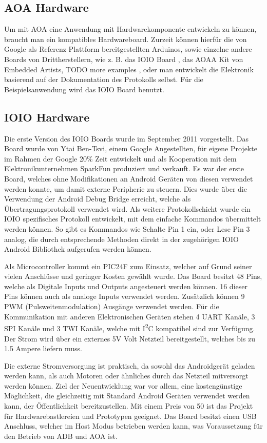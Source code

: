 \documentclass[12pt,journal,compsoc]{IEEEtran}
\begin{document}
\subsection{AOA Hardware}
Um mit AOA eine Anwendung mit Hardwarekomponente entwickeln zu können, braucht man ein kompatibles Hardwareboard.
Zurzeit können hierfür die von Google als Referenz Plattform bereitgestellten Arduinos, sowie einzelne andere Boards von Drittherstellern, wie z. B. das IOIO Board \cite{ioio}, das AOAA Kit von Embedded Artists\cite{aoaa},  TODO more examples , oder man entwickelt die Elektronik basierend auf der Dokumentation des Protokolls selbst\cite{aoaprotocol2}.
Für die Beispielsanwendung wird das IOIO Board benutzt.

\subsection{IOIO Hardware}
Die erste Version des IOIO Boards wurde im September 2011 vorgestellt. Das Board wurde von Ytai Ben-Tsvi, einem Google Angestellten, für eigene Projekte im Rahmen der Google 20\% Zeit entwickelt und als Kooperation mit dem Elektronikunternehmen SparkFun produziert und verkauft.
Es war der erste Board, welches ohne Modifikationen an Android Geräten von diesen verwendet werden konnte, um damit externe Peripherie zu steuern.
Dies wurde über die Verwendung der Android Debug Bridge erreicht, welche als Übertragungsprotokoll verwendet wird.
Als weitere Protokollschicht wurde ein IOIO spezifisches Protokoll entwickelt, mit dem einfache Kommandos übermittelt werden können.
So gibt es Kommandos wie \glqq Schalte Pin 1 ein\grqq, oder \glqq Lese Pin 3 analog\grqq, die durch entsprechende Methoden direkt in der zugehörigen IOIO Android Bibliothek aufgerufen werden können.

Als Microcontroller kommt ein PIC24F zum Einsatz, welcher auf Grund seiner vielen Anschlüsse und geringer Kosten gewählt wurde.
Das Board besitzt 48 Pins, welche als Digitale Inputs und Outputs angesteuert werden können. 16 dieser Pins können auch als analoge Inputs verwendet werden.
Zusätzlich können 9 PWM (Pulsweitenmodulation) Ausgänge verwendet werden.
Für die Kommunikation mit anderen Elektronischen Geräten stehen 4 UART Kanäle, 3 SPI Kanäle und 3 TWI Kanäle, welche mit I\textsuperscript{2}C kompatibel sind zur Verfügung.
Der Strom wird über ein externes 5V Volt Netzteil bereitgestellt, welches bis zu 1.5 Ampere liefern muss.

Die externe Stromversorgung ist praktisch, da sowohl das Androidgerät geladen werden kann, als auch Motoren oder ähnliches durch das Netzteil mitversorgt werden können.
Ziel der Neuentwicklung war vor allem, eine kostengünstige Möglichkeit, die gleichzeitig mit Standard Android Geräten verwendet werden kann, der Öffentlichkeit bereitzustellen.
Mit einem Preis von 50\textdollar{} ist das Projekt für Hardwarebastlereien und Prototypen geeignet.
Das Board besitzt einen USB Anschluss, welcher im Host Modus betrieben werden kann, was Voraussetzung für den Betrieb von ADB und AOA ist.
\end{document}
